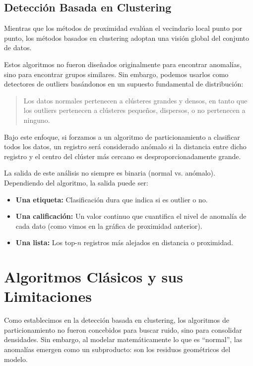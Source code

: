 \subsection{Detección Basada en Clustering}

Mientras que los métodos de proximidad evalúan el vecindario local punto por punto, los métodos basados en clustering adoptan una visión global del conjunto de datos.

Estos algoritmos no fueron diseñados originalmente para encontrar anomalías, sino para encontrar grupos similares. Sin embargo, podemos usarlos como detectores de outliers basándonos en un supuesto fundamental de distribución:

\begin{quote}
	Los datos normales pertenecen a clústeres grandes y densos, en tanto que los outliers pertenecen a clústeres pequeños, dispersos, o no pertenecen a ninguno.
\end{quote}

Bajo este enfoque, si forzamos a un algoritmo de particionamiento a clasificar todos los datos, un registro será considerado anómalo si la distancia entre dicho registro y el centro del clúster más cercano es desproporcionadamente grande.

La salida de este análisis no siempre es binaria (normal vs. anómalo). Dependiendo del algoritmo, la salida puede ser:

\begin{itemize}
	\item \textbf{Una etiqueta:} Clasificación dura que indica si es outlier o no.
	
	\item \textbf{Una calificación:} Un valor continuo que cuantifica el nivel de anomalía de cada dato (como vimos en la gráfica de proximidad anterior).
	
	\item \textbf{Una lista:} Los top-$n$ registros más alejados en distancia o proximidad.
\end{itemize}

\section{Algoritmos Clásicos y sus Limitaciones}

Como establecimos en la detección basada en clustering, los algoritmos de particionamiento no fueron concebidos para buscar ruido, sino para consolidar densidades. Sin embargo, al modelar matemáticamente lo que es ``normal'', las anomalías emergen como un subproducto: son los residuos geométricos del modelo.

